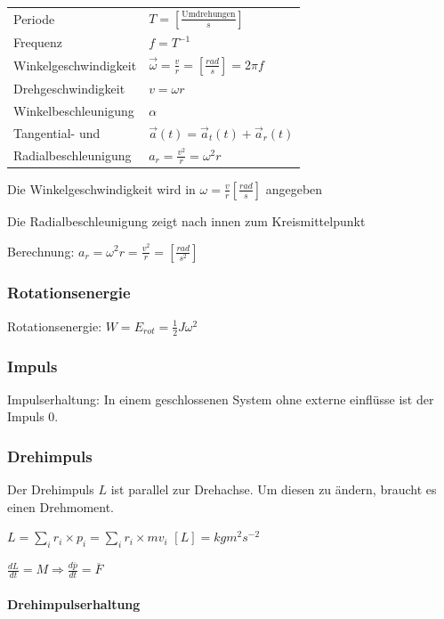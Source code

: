 \documentclass[a4paper]{scrartcl}
\begin{document}
	\begin{tabu} {l X}
		Periode & $T = \left[ \frac{\text{Umdrehungen}}{s}\right]$ \\ %
		Frequenz & $f = T^{-1}$ \\
		Winkelgeschwindigkeit & $\vec{\omega} =\frac{v}{r} = \left[ \frac{rad}{s} \right] = 2\pi f$ \\
		Drehgeschwindigkeit & $v = \omega r$ \\
		Winkelbeschleunigung & $\alpha$ \\ %
		Tangential- und & $\vec{a}(t) = \vec{a}_t(t) + \vec{a}_r(t)$ \\
		Radialbeschleunigung & $a_r = \frac{v^2}{r} = \omega^2 r$
	\end{tabu}
	

	Die Winkelgeschwindigkeit wird in $\omega = \frac{v}{r}\left[ \frac{rad}{s} \right]$ angegeben
	
	Die Radialbeschleunigung zeigt nach innen zum Kreismittelpunkt
	
	Berechnung: $a_r = \omega^2 r = \frac{v^2}{r} = \left[ \frac{rad}{s^2} \right]$

\subsubsection{Rotationsenergie}

	Rotationsenergie: $W = E_{rot} = \frac{1}{2} J \omega^2$
	
\subsubsection{Impuls}

Impulserhaltung: In einem geschlossenen System ohne externe einflüsse ist der Impuls 0. 
	
\subsubsection{Drehimpuls} %
	Der Drehimpuls $L$ ist parallel zur Drehachse. Um diesen zu ändern, braucht es einen Drehmoment.

	$L = \sum_i{r_i \times p_i} = \sum_i{r_i \times mv_i}$
	$\left[ L \right] = kg m^2 s^{-2}$
	
	$\frac{dL}{dt} = M \Rightarrow \frac{d\overline{p}}{dt} = \overline{F}$
	


	\paragraph{Drehimpulserhaltung}
	
\end{document}
